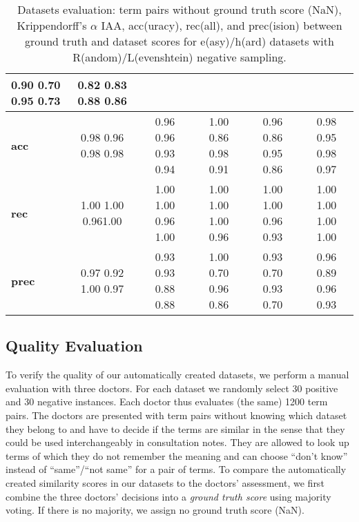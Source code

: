 \documentclass[letterpaper]{article} %
\begin{document}
\begin{table*}[t]
\begin{tabular}{l ccccc}
         0.90 \hfill 0.70 \hfill 0.95 \hfill 0.73 &
         0.82 \hfill 0.83 \hfill 0.88 \hfill 0.86 \\ \midrule
         \textbf{acc} & 0.98 \hfill 0.96 \hfill 0.98 \hfill 0.98 &
         0.96 \hfill 0.96 \hfill 0.93 \hfill 0.94 &
         1.00 \hfill 0.86 \hfill 0.98 \hfill 0.91&
         0.96 \hfill 0.86 \hfill 0.95 \hfill 0.86&
         0.98 \hfill 0.95 \hfill 0.98 \hfill 0.97\\
         \textbf{rec} & 1.00 \hfill 1.00 \hfill 0.96\hfill 1.00&
         1.00 \hfill 1.00 \hfill 0.96 \hfill 1.00 &
         1.00 \hfill 1.00 \hfill 1.00 \hfill 0.96 &
         1.00 \hfill 1.00 \hfill 0.96 \hfill 0.93 &
         1.00 \hfill 1.00 \hfill 1.00 \hfill 1.00 \\
         \textbf{prec} & 0.97 \hfill 0.92 \hfill 1.00 \hfill 0.97&
         0.93 \hfill 0.93 \hfill 0.88 \hfill 0.88 &
         1.00 \hfill 0.70 \hfill 0.96 \hfill 0.86 &
         0.93 \hfill 0.70 \hfill 0.93 \hfill 0.70 &
         0.96 \hfill 0.89 \hfill 0.96 \hfill 0.93 \\
         \bottomrule
    \end{tabular}
    \caption{Datasets evaluation: term pairs without ground truth score (NaN), Krippendorff's $\alpha$ IAA,
    acc(uracy), rec(all), and prec(ision) between ground truth and dataset scores for  e(asy)/h(ard) datasets with R(andom)/L(evenshtein) negative sampling.}
    \label{tab:datasets_evaluation}
\end{table*}

\subsection{Quality Evaluation}

To verify the quality of our automatically created datasets, we perform a manual evaluation with three doctors.
For each dataset we randomly select 30 positive and 30 negative instances.
Each doctor thus evaluates (the same) 1200 term pairs.
The doctors are presented with term pairs without knowing which dataset they belong to and have to decide if the terms are similar in the sense that they could be used interchangeably in consultation notes.
They are allowed to look up terms of which they do not remember the meaning and can choose ``don't know'' instead of ``same''/``not same'' for a pair of terms.
To compare the automatically created similarity scores in our datasets to the doctors' assessment, we first combine the three doctors' decisions into a \emph{ground truth score} using majority voting. If there is no majority, we assign no ground truth score (NaN).
\end{document}
